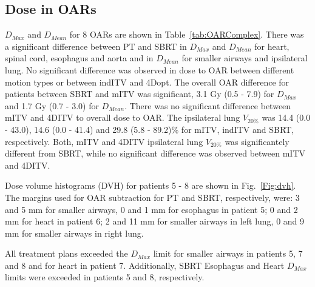 \subsection{Dose in OARs}

$D_{Max}$ and $D_{Mean}$ for 8 OARs are shown in Table~\ref{tab:OARComplex}. There was a significant difference between PT and SBRT in $D_{Max}$ and $D_{Mean}$ for heart, spinal cord, esophagus and aorta and in $D_{Mean}$ for smaller airways and
ipsilateral lung.
No significant difference was observed in dose to OAR between different motion types or between indITV and 4Dopt.
The overall OAR difference for patients between SBRT and mITV
was significant, 3.1 Gy (0.5 - 7.9)  for $D_{Max}$ and 1.7 Gy (0.7 - 3.0) for $D_{Mean}$. There was no significant difference between mITV and 4DITV to overall dose to OAR.
The ipsilateral lung $V_{20\%}$ was 14.4 (0.0 - 43.0), 14.6 (0.0 - 41.4) and 29.8 (5.8 - 89.2)\% for mITV, indITV and SBRT, respectively. Both, mITV and 4DITV ipsilateral lung $V_{20\%}$ was
significantely different from SBRT, while no significant difference was observed between mITV and 4DITV.

Dose volume histograms (DVH) for patients 5 - 8 are shown in Fig.~\ref{Fig:dvh}. The margins used for OAR subtraction for PT and SBRT, respectively, were:
3 and 5 mm for smaller airways, 0 and 1 mm for esophagus in patient 5; 
0 and 2 mm for heart in patient 6; 
2 and 11 mm for smaller airways in left lung, 0 and 9 mm for smaller airways in right lung.

All treatment plans exceeded the $D_{Max}$ limit for smaller airways in patients 5, 7 and 8 and for heart in patient 7. 
Additionally, SBRT Esophagus and Heart $D_{Max}$ limits were exceeded in patients 5 and 8, respectively.


